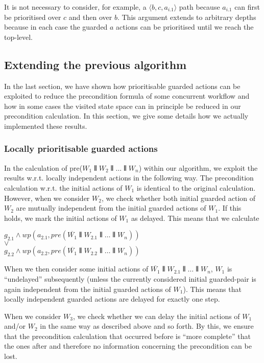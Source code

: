 \documentclass[11pt]{article}
\begin{document}
It is not necessary to consider, for example, a $\langle b,c,a_{i.1}\rangle$ path because $a_{i.1}$ can first be prioritised over $c$ and then over $b$. This argument extends to arbitrary depths because in each case the guarded $a$ actions can be prioritised until we reach the top-level. 


\subsection{Extending the previous algorithm}

In the last section, we have shown how prioritisable guarded actions can be exploited to reduce the precondition formula of some concurrent workflow and how in some cases the visited state space can in principle be reduced in our precondition calculation. In this section, we give some details how we actually implemented these results. 

\subsubsection{Locally prioritisable guarded actions}

In the calculation of pre($W_1 \interleave W_2 \interleave \dots \interleave W_n$) within our algorithm, we exploit the results w.r.t. locally independent actions in the following way. The precondition calculation w.r.t. the initial actions of $W_1$ is identical to the original calculation. However, when we consider $W_2$, we check whether both initial guarded action of $W_2$ are mutually independent from the initial guarded actions of $W_1$. If this holds, we mark the initial actions of $W_1$ as delayed. This means that we calculate 

\noindent
$g_{2.1} \land wp(a_{2.1} , pre(\overline{W_1} \interleave W_{2.1} \interleave \dots \interleave W_n))$ \\
$\lor$ \\
$g_{2.2} \land wp(a_{2.2} , pre(\overline{W_1} \interleave W_{2.2} \interleave \dots \interleave W_n))$

When we then consider some initial actions of $\overline{W_1} \interleave W_{2.1} \interleave \dots \interleave W_n$, $W_1$ is ``undelayed'' subsequently (unless the currently considered initial guarded-pair is again independent from the initial guarded actions of $W_1$). This means that locally independent guarded actions are delayed for exactly one step.

When we consider $W_3$, we check whether we can delay the initial actions of $W_1$ and/or $W_2$ in the same way as described above and so forth. By this, we ensure that the precondition calculation that occurred before is ``more complete'' that the ones after and therefore no information concerning the precondition can be lost.
\end{document}
